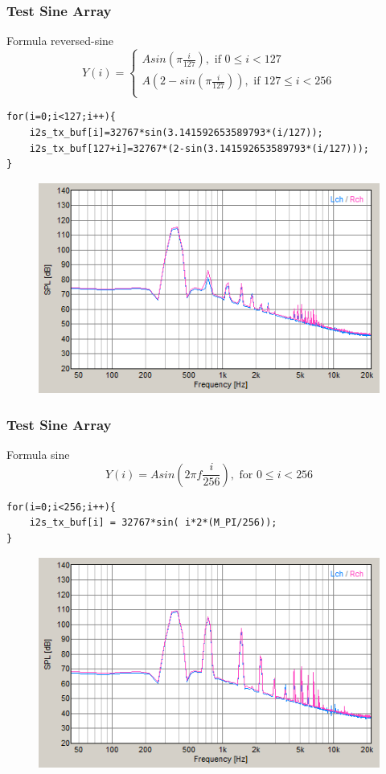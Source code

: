 \documentclass[table,dvipsnames,10pt]{beamer}
\begin{document}
	\begin{frame}[fragile]
	\frametitle{Test Sine Array}
	\begin{exampleblock}{Formula reversed-sine}
		\[
		Y(i) =
		\begin{cases}
		A sin(\pi \frac{i}{127}), \text{ if } 0 \leq i < 127\\
		A(2-sin(\pi \frac{i}{127})), \text{ if } 127 \leq i < 256\\
		\end{cases}
		\]
	\end{exampleblock}
	\begin{exampleblock}{}
		\begin{verbatim}
for(i=0;i<127;i++){
	i2s_tx_buf[i]=32767*sin(3.141592653589793*(i/127));
	i2s_tx_buf[127+i]=32767*(2-sin(3.141592653589793*(i/127)));
}
		\end{verbatim}
	\end{exampleblock}
	\begin{exampleblock}{}
		\begin{figure}[H]
			\centering
			\includegraphics[width=0.45\linewidth]{result/day_1/halfMax256}
		\end{figure}
	\end{exampleblock}
	\end{frame}

	\begin{frame}[fragile]
	\frametitle{Test Sine Array}
	\begin{exampleblock}{Formula sine}
		\[ Y(i) = A sin(2\pi f \frac{i}{256}), \text{ for } 0 \leq i < 256 \]
	\end{exampleblock}
	\begin{exampleblock}{}
		\begin{verbatim}
for(i=0;i<256;i++){
	i2s_tx_buf[i] = 32767*sin( i*2*(M_PI/256));
}
		\end{verbatim}
	\end{exampleblock}
	\begin{exampleblock}{}
		\begin{figure}[H]
			\centering
			\includegraphics[width=0.45\linewidth]{result/day_1/Max256}
		\end{figure}
	\end{exampleblock}
	\end{frame}
\end{document}
